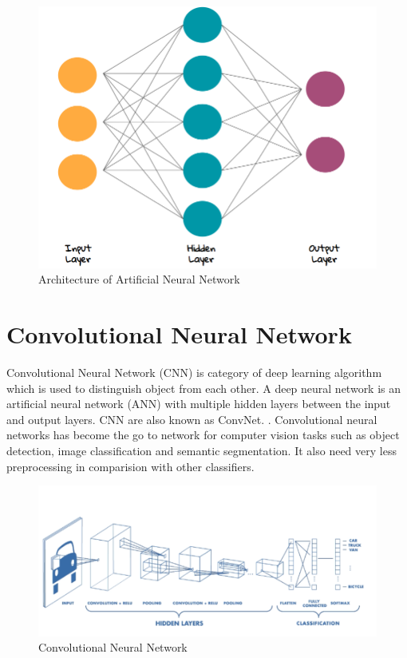 \begin{figure}[H]
  \centering
  \includegraphics[scale=0.45]{images/Chapter2/ann.png}
  \caption{Architecture of Artificial Neural Network \cite{fig_ann}}
  \label{fig:ann}
\end{figure}

\section{Convolutional Neural Network}
Convolutional Neural Network (CNN) is category of deep learning algorithm which is used to distinguish object from each other. A deep neural network is an artificial neural network (ANN) with multiple hidden layers between the input and output layers. CNN are also known as ConvNet.  \cite{Szegedy_2016_CVPR}. Convolutional neural networks has become the go to network for computer vision tasks such as object detection, image classification and semantic segmentation. It also need very less preprocessing in comparision with other classifiers.
\begin{figure}[H]
  \centering
  \includegraphics[scale=0.7]{images/Chapter2/cnn-arch.png}
  \caption{Convolutional Neural Network \cite{arch_cnn}}
  \label{cnn-arch}
\end{figure}
